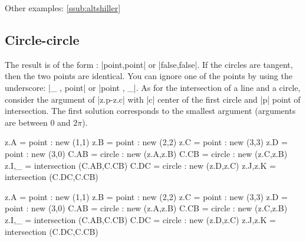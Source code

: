 Other examples: \ref{ssub:altshiller}

\newpage
\subsection{Circle-circle} %
\label{sub:circle_circle}

The result is of the form : |point,point| or |false,false|. If the circles are  tangent, then the two points are identical. You can ignore one of the points by using the underscore: |_ , point| or |point , _|. As for the intersection of a line and a circle, consider the argument of |z.p-z.c|  with |c| center of the first circle and |p| point of intersection. The first solution corresponds to the smallest argument (arguments are between 0 and $2\pi$).

\begin{minipage}{0.5\textwidth}
\begin{tkzexample}
\begin{tkzelements}
   z.A      = point : new (1,1)
   z.B      = point : new (2,2)
   z.C      = point : new (3,3)
   z.D      = point : new (3,0)
   C.AB     = circle : new (z.A,z.B)
   C.CB     = circle : new (z.C,z.B)
   z.I,_    = intersection (C.AB,C.CB)
   C.DC     = circle : new (z.D,z.C)
   z.J,z.K  = intersection (C.DC,C.CB)
\end{tkzelements}
\end{tkzexample}
\end{minipage}
\begin{minipage}{0.5\textwidth}
\begin{tkzelements}
z.A = point : new (1,1)
z.B = point : new (2,2)
z.C = point : new (3,3)
z.D = point : new (3,0)
C.AB = circle : new (z.A,z.B)
C.CB = circle : new (z.C,z.B)
z.I,_ = intersection (C.AB,C.CB)
C.DC = circle : new (z.D,z.C)
 z.J,z.K = intersection (C.DC,C.CB)
\end{tkzelements}

\end{minipage}

